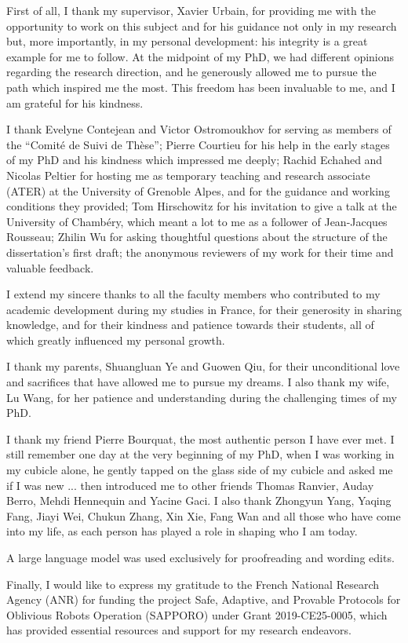 First of all, I thank my supervisor, Xavier Urbain, for providing me with the opportunity to work on this subject and for his guidance not only in my research but, more importantly, in my personal development: his integrity is a great example for me to follow. At the midpoint of my PhD, we had different opinions regarding the research direction, and he generously allowed me to pursue the path which inspired me the most. This freedom has been invaluable to me, and I am grateful for his kindness.

I thank Evelyne Contejean and Victor Ostromoukhov for serving as members of the \enquote{Comité de Suivi de Thèse}; Pierre Courtieu for his help in the early stages of my PhD and his kindness which impressed me deeply; Rachid Echahed and Nicolas Peltier for hosting me as temporary teaching and research associate (ATER) at the University of Grenoble Alpes,
 and for the guidance and working conditions they provided;
Tom Hirschowitz for his invitation to give a talk at the University of Chambéry, which meant a lot to me as a follower of Jean-Jacques Rousseau; 
Zhilin Wu for asking thoughtful questions about the structure of the dissertation's first draft; the anonymous reviewers of my work for their time and valuable feedback.

I extend my sincere thanks to all the faculty members who contributed to my academic development during my studies in France, for their generosity in sharing knowledge, and for their kindness and patience towards their students, all of which greatly influenced my personal growth.

I thank my parents, Shuangluan Ye and Guowen Qiu, for their unconditional love and sacrifices that have allowed me to pursue my dreams. I also thank my wife, Lu Wang, for her patience and understanding during the challenging times of my PhD.

I thank my friend Pierre Bourquat, the most authentic person I have ever met. I still remember one day at the very beginning of my PhD, when I was working in my cubicle alone, he gently tapped on the glass side of my cubicle and asked me if I was new ... then introduced me to other friends Thomas Ranvier, Auday Berro, Mehdi Hennequin and Yacine Gaci. I also thank Zhongyun Yang, Yaqing Fang, Jiayi Wei, Chukun Zhang, Xin Xie, Fang Wan and all those who have come into my life, as each person has played a role in shaping who I am today.

A large language model was used exclusively for proofreading and wording edits.

Finally, I would like to express my gratitude to the French National Research Agency (ANR) for funding the project Safe, Adaptive, and Provable Protocols for Oblivious Robots Operation (SAPPORO) under Grant 2019-CE25-0005, which has provided essential resources and support for my research endeavors.  
